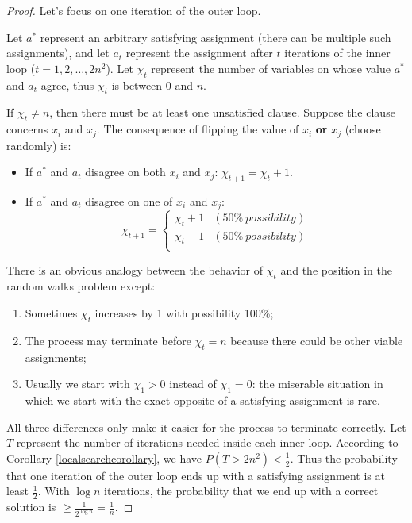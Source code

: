 \begin{proof}
Let's focus on one iteration of the outer loop. 

Let $a^*$ represent an arbitrary satisfying assignment (there can be multiple such assignments), and let $a_t$ represent the assignment after $t$ iterations of the inner loop ($t=1,2,\dots,2n^2$). Let $\chi_t$ represent the number of variables on whose value $a^*$ and $a_t$ agree, thus $\chi_t$ is between 0 and $n$. 

If $\chi_t\neq n$, then there must be at least one unsatisfied clause. Suppose the clause concerns $x_i$ and $x_j$. The consequence of flipping the value of $x_i$ \textbf{or} $x_j$ (choose randomly) is:
\begin{itemize}
\item If $a^*$ and $a_t$ disagree on both $x_i$ and $x_j$: $\chi_{t+1}=\chi_t+1$.
\item If $a^*$ and $a_t$ disagree on one of $x_i$ and $x_j$:
\begin{equation*}
\chi_{t+1}=\begin{cases}
\chi_t+1&(50\%\:possibility)\\
\chi_t-1&(50\%\:possibility)\\
\end{cases}
\end{equation*}
\end{itemize}
There is an obvious analogy between the behavior of $\chi_t$ and the position in the random walks problem except:
\begin{enumerate}
\item Sometimes $\chi_t$ increases by 1 with possibility 100\%;
\item The process may terminate before $\chi_t=n$ because there could be other viable assignments;
\item Usually we start with $\chi_1>0$ instead of $\chi_1=0$: the miserable situation in which we start with the exact opposite of a satisfying assignment is rare. 
\end{enumerate}
All three differences only make it easier for the process to terminate correctly. Let $T$ represent the number of iterations needed inside each inner loop. According to Corollary \ref{localsearchcorollary}, we have $P(T>2n^2)<\frac{1}{2}$. Thus the probability that one iteration of the outer loop ends up with a satisfying assignment is at least $\frac{1}{2}$. With $\log n$ iterations, the probability that we end up with a correct solution is $\geq\frac{1}{2^{\log n}}=\frac{1}{n}.$


\end{proof}
\ifx\PREAMBLE\undefined

\fi
